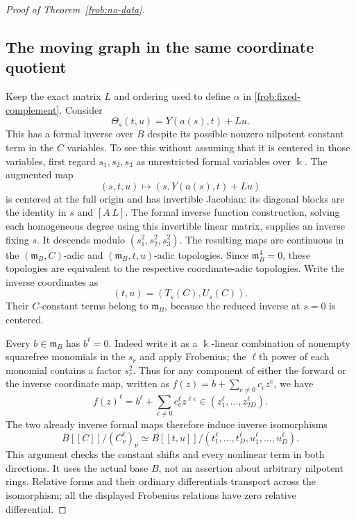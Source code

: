 \begin{proof}[Proof of Theorem~\ref{frob:no-data}]
\subsection{The moving graph in the same coordinate quotient}
\label{frob:moving-graph}

Keep the exact matrix $L$ and ordering used to define $\alpha$ in
\eqref{frob:fixed-complement}.  Consider
\begin{equation}
                \Theta_s(t,u)=Y(a(s),t)+Lu.
 \label{frob:moving-coordinate-map}
\end{equation}
This has a formal inverse over $B$ despite its possible nonzero
nilpotent constant term in the $C$ variables.  To see this without
assuming that it is centered in those variables, first regard
$s_1,s_2,s_3$ as unrestricted formal variables over $\Bbbk$.
The augmented map
\[
              (s,t,u)\longmapsto (s,Y(a(s),t)+Lu)
\]
is centered at the full origin and has invertible Jacobian: its
diagonal blocks are the identity in $s$ and $[A\ L]$.  The formal
inverse function construction, solving each homogeneous degree using
this invertible linear matrix, supplies an inverse fixing $s$.
It descends modulo $(s_1^2,s_2^2,s_3^2)$.  The resulting maps are
continuous in the $(\mathfrak m_B,C)$-adic and
$(\mathfrak m_B,t,u)$-adic topologies.  Since $\mathfrak m_B^4=0$,
these topologies are equivalent to the respective coordinate-adic
topologies.  Write the inverse coordinates as
\[
                         (t,u)=(T_s(C),U_s(C)).
\]
Their $C$-constant terms belong to $\mathfrak m_B$, because the
reduced inverse at $s=0$ is centered.

Every $b\in\mathfrak m_B$ has $b^\ell=0$.  Indeed write it as a
$\Bbbk$-linear combination of nonempty squarefree monomials in
the $s_r$ and apply Frobenius; the $\ell$th power of each monomial
contains a factor $s_r^2$.  Thus for any component of either the
forward or the inverse coordinate map, written as
$f(z)=b+\sum_{e\ne0}c_ez^e$, we have
\begin{equation}
 f(z)^\ell=b^\ell+\sum_{e\ne0}c_e^\ell z^{\ell e}
                         \in(z_1^\ell,\ldots,z_{2D}^\ell).
 \label{frob:both-directions}
\end{equation}
The two already inverse formal maps therefore induce inverse
isomorphisms
\begin{equation}
 B[[C]]/(C_\nu^\ell)_\nu
       \simeq B[[t,u]]/(t_1^\ell,\ldots,t_D^\ell,u_1^\ell,\ldots,u_D^\ell).
 \label{frob:translated-quotient}
\end{equation}
This argument checks the constant shifts and every nonlinear term
in both directions.  It uses the actual base $B$, not an assertion
about arbitrary nilpotent rings.  Relative forms and their ordinary
differentials transport across the isomorphism; all the displayed
Frobenius relations have zero relative differential.


\end{proof}
